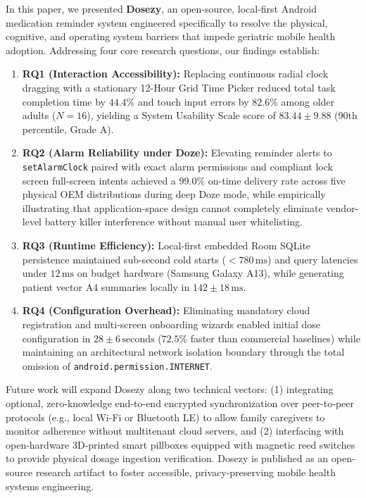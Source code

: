 \documentclass[11pt,a4paper]{article}
\begin{document}
In this paper, we presented \textbf{Dosezy}, an open-source, local-first Android medication reminder system engineered specifically to resolve the physical, cognitive, and operating system barriers that impede geriatric mobile health adoption. Addressing four core research questions, our findings establish:
\begin{enumerate}
    \item \textbf{RQ1 (Interaction Accessibility):} Replacing continuous radial clock dragging with a stationary 12-Hour Grid Time Picker reduced total task completion time by $44.4\%$ and touch input errors by $82.6\%$ among older adults ($N=16$), yielding a System Usability Scale score of $83.44 \pm 9.88$ (90th percentile, Grade A).
    \item \textbf{RQ2 (Alarm Reliability under Doze):} Elevating reminder alerts to \texttt{setAlarmClock} paired with exact alarm permissions and compliant lock screen full-screen intents achieved a $99.0\%$ on-time delivery rate across five physical OEM distributions during deep Doze mode, while empirically illustrating that application-space design cannot completely eliminate vendor-level battery killer interference without manual user whitelisting.
    \item \textbf{RQ3 (Runtime Efficiency):} Local-first embedded Room SQLite persistence maintained sub-second cold starts ($< 780\,\text{ms}$) and query latencies under $12\,\text{ms}$ on budget hardware (Samsung Galaxy A13), while generating patient vector A4 summaries locally in $142 \pm 18\,\text{ms}$.
    \item \textbf{RQ4 (Configuration Overhead):} Eliminating mandatory cloud registration and multi-screen onboarding wizards enabled initial dose configuration in $28 \pm 6\,\text{seconds}$ ($72.5\%$ faster than commercial baselines) while maintaining an architectural network isolation boundary through the total omission of \texttt{android.permission.INTERNET}.
\end{enumerate}

Future work will expand Dosezy along two technical vectors: (1) integrating optional, zero-knowledge end-to-end encrypted synchronization over peer-to-peer protocols (e.g., local Wi-Fi or Bluetooth LE) to allow family caregivers to monitor adherence without multitenant cloud servers, and (2) interfacing with open-hardware 3D-printed smart pillboxes equipped with magnetic reed switches to provide physical dosage ingestion verification. Dosezy is published as an open-source research artifact to foster accessible, privacy-preserving mobile health systems engineering.



\end{document}
